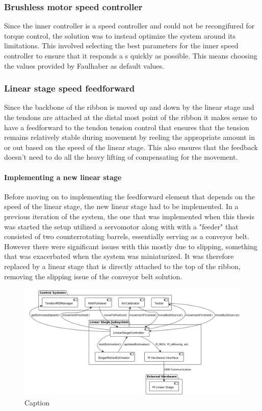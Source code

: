 
\subsubsection{Brushless motor speed controller}
Since the inner controller is a speed controller and could not be recongifured for torque control, the solution was to instead optimize the system around its limitations. This involved selecting the best parameters for the inner speed controller to ensure that it responds a s quickly as possible. This means choosing the values provided by Faulhaber as default values. 

\subsubsection{Linear stage speed feedforward}
Since the backbone of the ribbon is moved up and down by the linear stage and the tendons are attached at the distal most point of the ribbon it makes sense to have a feedforward to the tendon tension control that ensures that the tension remains relatively stable during movement by reeling the appropriate amount in or out based on the speed of the linear stage. This also ensures that the feedback doesn't need to do all the heavy lifting of compensating for the movement.

\paragraph*{Implementing a new linear stage}
Before moving on to implementing the feedforward element that depends on the speed of the linear stage, the new linear stage had to be implemented. In a previous iteration of the system, the one that was implemented when this thesis was started the setup utilized a servomotor along with with a "feeder" that consisted of two counterrotating barrels, essentially serving as a conveyor belt. However there were significant issues with this mostly due to slipping, something that was exacerbated when the system was miniaturized. It was therefore replaced by a linear stage that is directly attached to the top of the ribbon, removing the slipping issue of the conveyor belt solution.

\begin{figure}[H]
    \centering
    \includegraphics[width=\linewidth]{images/linearstage/architecture.png}
    \caption{Caption}
    \label{fig:enter-label}
\end{figure}

